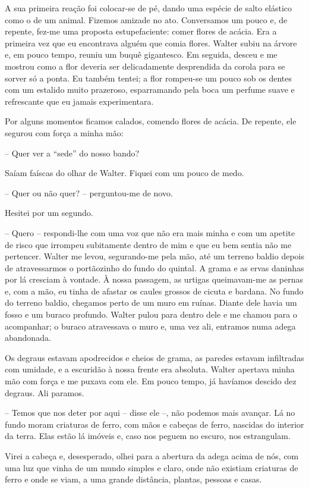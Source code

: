 A sua primeira reação foi colocar-se de pé, dando uma espécie de salto elástico como o de um animal. Fizemos amizade no ato. Conversamos um pouco e, de repente, fez-me uma proposta estupefaciente: comer flores de acácia. Era a primeira vez que eu encontrava alguém que comia flores. Walter subiu na árvore e, em pouco tempo, reuniu um buquê gigantesco. Em seguida, desceu e me mostrou como a flor deveria ser delicadamente desprendida da corola para se sorver só a ponta. Eu também tentei; a flor rompeu-se um pouco sob os dentes com um estalido muito prazeroso, esparramando pela boca um perfume suave e refrescante que eu jamais experimentara.

Por alguns momentos ficamos calados, comendo flores de acácia. De repente, ele segurou com força a minha mão: 

-- Quer ver a ``sede'' do nosso bando?

Saíam faíscas do olhar de Walter. Fiquei com um pouco de medo. 

-- Quer ou não quer? -- perguntou-me de novo. 

Hesitei por um segundo. 

-- Quero -- respondi-lhe com uma voz que não era mais minha e com um apetite de risco que irrompeu subitamente dentro de mim e que eu bem sentia não me pertencer.
Walter me levou, segurando-me pela mão, até um terreno baldio depois de atravessarmos o portãozinho do fundo do quintal. A grama e as ervas daninhas por lá cresciam à vontade. À nossa passagem, as urtigas queimavam-me as pernas e, com a mão, eu tinha de afastar os caules grossos de cicuta e bardana. No fundo do terreno baldio, chegamos perto de um muro em ruínas. Diante dele havia um fosso e um buraco profundo. Walter pulou para dentro dele e me chamou para o acompanhar; o buraco atravessava o muro e, uma vez ali, entramos numa adega abandonada.

Os degraus estavam apodrecidos e cheios de grama, as paredes estavam infiltradas com umidade, e a escuridão à nossa frente era absoluta. Walter apertava minha mão com força e me puxava com ele. Em pouco tempo, já havíamos descido dez degraus. Ali paramos.

-- Temos que nos deter por aqui -- disse ele --, não podemos mais avançar. Lá no fundo moram criaturas de ferro, com mãos e cabeças de ferro, nascidas do interior da terra. Elas estão lá imóveis e, caso nos peguem no escuro, nos estrangulam.

Virei a cabeça e, desesperado, olhei para a abertura da adega acima de nós, com uma luz que vinha de um mundo simples e claro, onde não existiam criaturas de ferro e onde se viam, a uma grande distância, plantas, pessoas e casas.


